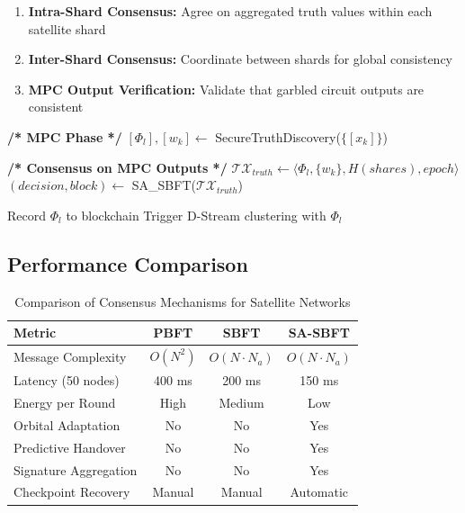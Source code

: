 \begin{enumerate}
    \item \textbf{Intra-Shard Consensus:} Agree on aggregated truth values within each satellite shard
    \item \textbf{Inter-Shard Consensus:} Coordinate between shards for global consistency
    \item \textbf{MPC Output Verification:} Validate that garbled circuit outputs are consistent
\end{enumerate}

\begin{algorithm}[H] \small
\caption{Truth Discovery with SA-SBFT Integration}
\begin{algorithmic}[1]
\State \textbf{/* MPC Phase */}
\State $[\Phi_l], [w_k] \leftarrow$ SecureTruthDiscovery($\{[x_k]\}$) 

\State \textbf{/* Consensus on MPC Outputs */}
\State $\mathcal{TX}_{truth} \leftarrow \langle \Phi_l, \{w_k\}, H(shares), epoch \rangle$
\State $(decision, block) \leftarrow$ SA\_SBFT($\mathcal{TX}_{truth}$)

    \State Record $\Phi_l$ to blockchain
    \State Trigger D-Stream clustering with $\Phi_l$
\EndIf
\end{algorithmic}
\end{algorithm}


\subsection{Performance Comparison}

\begin{table}[H]
\centering
\caption{Comparison of Consensus Mechanisms for Satellite Networks}
\label{tab:consensus_comparison}
\begin{tabular}{lccc}
\toprule
\textbf{Metric} & \textbf{PBFT} & \textbf{SBFT} & \textbf{SA-SBFT} \\
\midrule
Message Complexity & $O(N^2)$ & $O(N \cdot N_a)$ & $O(N \cdot N_a)$ \\
Latency (50 nodes) & 400 ms & 200 ms & 150 ms \\
Energy per Round & High & Medium & Low \\
Orbital Adaptation & No & No & Yes \\
Predictive Handover & No & No & Yes \\
Signature Aggregation & No & No & Yes \\
Checkpoint Recovery & Manual & Manual & Automatic \\
\bottomrule
\end{tabular}
\end{table}


